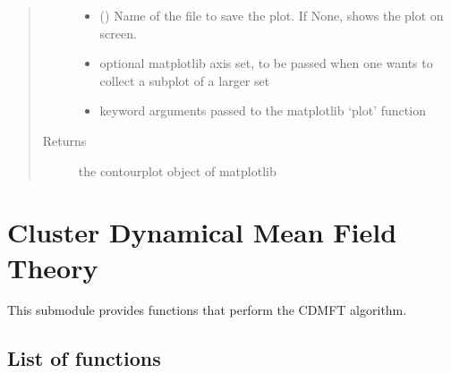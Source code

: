\documentclass[letterpaper,10pt,english]{sphinxmanual}
\begin{document}
\begin{fulllineitems}
\begin{quote}
\begin{description}
\begin{itemize}
\item {} 
\sphinxAtStartPar
{} () \textendash{} Name of the file to save the plot. If None, shows the plot on screen.

\item {} 
\sphinxAtStartPar
{} \textendash{} optional matplotlib axis set, to be passed when one wants to collect a subplot of a larger set

\item {} 
\sphinxAtStartPar
{} \textendash{} keyword arguments passed to the matplotlib ‘plot’ function

\end{itemize}

\item[{Returns}] \leavevmode
\sphinxAtStartPar
the contourplot object of matplotlib

\end{description}\end{quote}

\end{fulllineitems}



\chapter{Cluster Dynamical Mean Field Theory}
\label{\detokenize{cdmft:cluster-dynamical-mean-field-theory}}\label{\detokenize{cdmft::doc}}
\sphinxAtStartPar
This submodule provides functions that perform the CDMFT algorithm.


\section{List of functions}
\label{\detokenize{cdmft:module-pyqcm.cdmft}}\label{\detokenize{cdmft:list-of-functions}}
\end{document}
